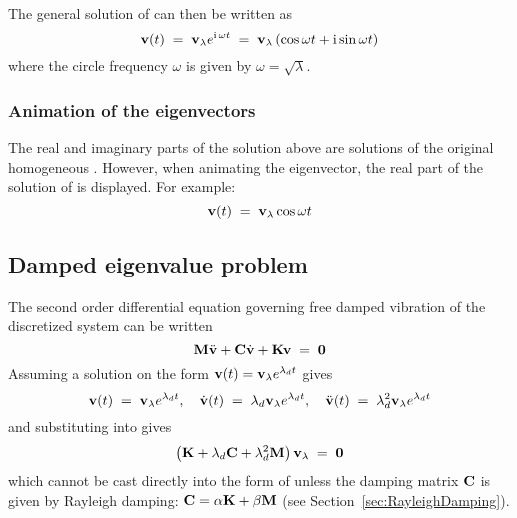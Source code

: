 The general solution of 
can then be written as
%
\begin{equation}
{\bf v}(t) \;=\; {\bf v}_{\lambda} e^{\text{i}\,\omega t} \;=\;
{\bf v}_{\lambda} \left(\cos\omega t + \text{i}\sin\omega t\right)
\label{eqEIG:UndampSolution}
\end{equation}
%
where the circle frequency $\omega$ is given by $\omega = \sqrt{\lambda}$.

\subsubsection{Animation of the eigenvectors}

The real and imaginary parts of the solution above are solutions of the original
homogeneous .
However, when animating the eigenvector, the real part of the solution of
 is displayed.
For example:
%
\begin{equation}
{\bf v}(t) \;=\; {\bf v}_{\lambda} \cos\omega t
\label{eqEIG:UndampAnimation}
\end{equation}



\subsection{Damped eigenvalue problem}

The second order differential equation governing free damped vibration of the
discretized system can be written
%
\begin{equation}
{\bf M}\ddot{\bf v} + {\bf C}\dot{\bf v}+ {\bf K}{\bf v} \;=\; {\bf 0}
\label{eqEIG:DiffDamped}
\end{equation}
%
Assuming a solution on the form ${\bf v}(t) = {\bf v}_{\lambda} e^{\lambda_d t}$
gives
%
\begin{equation}
{\bf v}(t) \;=\; {\bf v}_{\lambda} e^{\lambda_d t}, \quad
\dot{\bf v}(t) \;=\; \lambda_d{\bf v}_{\lambda} e^{\lambda_d t}, \quad
\ddot{\bf v}(t) \;=\; \lambda_d^2{\bf v}_{\lambda} e^{\lambda_d t}
\label{eqEIG:AssumedSol2}
\end{equation}
%
and substituting into  gives
%
\begin{equation}
\left({\bf K} + \lambda_d{\bf C} + \lambda_d^2{\bf M}\right){\bf v}_{\lambda}
\;=\; {\bf 0}
\label{eqEIG:Damp1}
\end{equation}
%
which cannot be cast directly into the form of 
unless the damping matrix $\bf C$ is given by Rayleigh damping:
${\bf C} = \alpha{\bf K} + \beta{\bf M}$
(see Section~\ref{sec:RayleighDamping}).

